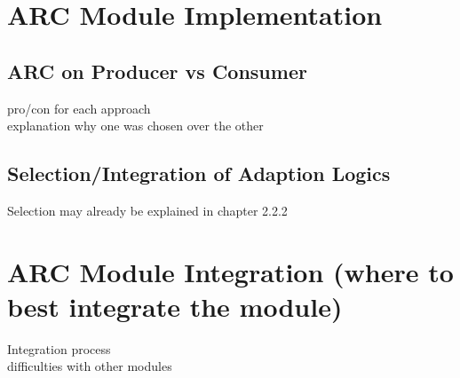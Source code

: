 \section{ARC Module Implementation}


\subsection{ARC on Producer vs Consumer}
pro/con for each approach \\
explanation why one was chosen over the other

\subsection{Selection/Integration of Adaption Logics}
Selection may already be explained in chapter 2.2.2


\section{ARC Module Integration (where to best integrate the module)}
Integration process \\
difficulties with other modules

